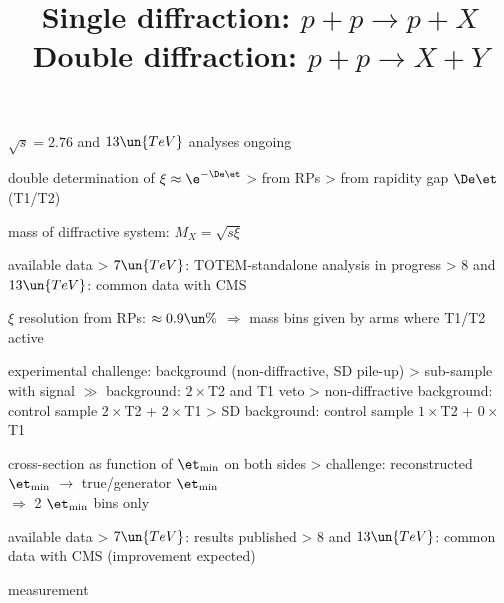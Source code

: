 \> $\sqrt s = 2.76$ and $13\un{TeV}$ analyses ongoing

\newpage %
\title{Single diffraction: $p + p \rightarrow p + X$}

\centerline{}

\> double determination of $\xi \approx \e^{-\De\et}$
\>> from RPs
\>> from rapidity gap $\De\et$ (T1/T2)

\> mass of diffractive system: \cBlack $M_X = \sqrt{s \xi}$ 

\> available data
\>> $7\un{TeV}$: TOTEM-standalone analysis in progress
\>> $8$ and $13\un{TeV}$: common data with CMS

\> $\xi$ resolution from RPs: $\approx 0.9\un{\%}$ $\Rightarrow$ mass bins given by arms where T1/T2 active

\newpage %

\centerline{}

\newpage %
\title{Double diffraction: $p + p \rightarrow X + Y$}

\centerline{}

\> experimental challenge: background (non-diffractive, SD pile-up)
\>> sub-sample with signal $\gg$ background:  $2\times$T2 and T1 veto
\>> non-diffractive background: control sample $2\times$T2 + $2\times$T1
\>> SD background: control sample $1\times$T2 + $0\times$T1

\> cross-section as function of $\et_{\rm min}$ on both sides
\>> challenge: reconstructed $\et_{\rm min}$ $\longrightarrow$ true/generator $\et_{\rm min}$\\
$\Rightarrow$ 2 $\et_{\rm min}$ bins only

\> available data
\>> $7\un{TeV}$: results published
\>> $8$ and $13\un{TeV}$: common data with CMS (improvement expected)

\newpage %

\> measurement

\centerline{}

